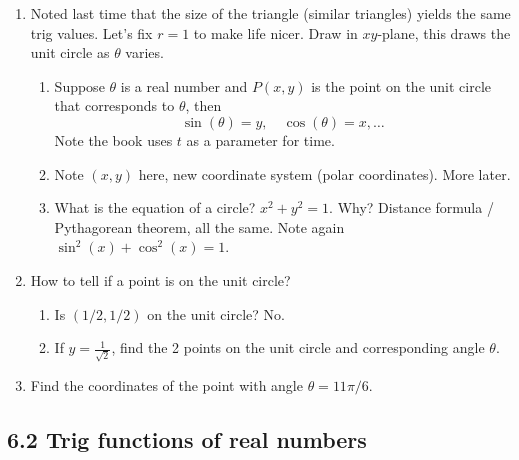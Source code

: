 \documentclass{article}
\begin{document}
\begin{enumerate}

\item Noted last time that the size of the triangle (similar triangles) yields the same trig values. Let's fix $r=1$ to make life nicer. Draw in $xy$-plane, this draws the unit circle as $\theta$ varies.
\begin{enumerate}
\item Suppose $\theta$ is a real number and $P(x,y)$ is the point on the unit circle that corresponds to $\theta$, then
$$
\sin(\theta) = y, \quad \cos(\theta) = x, \dots
$$ 
Note the book uses $t$ as a parameter for time.
\item Note $(x,y)$ here, new coordinate system (polar coordinates). More later.
\item What is the equation of a circle? $x^2+y^2=1$. Why? Distance formula / Pythagorean theorem, all the same. Note again $\sin^2(x)+\cos^2(x)=1$.
\end{enumerate}

\item How to tell if a point is on the unit circle?
\begin{enumerate}
\item Is $(1/2, 1/2)$ on the unit circle? No.
\item If $y= \frac{1}{\sqrt{2}}$, find the 2 points on the unit circle and corresponding angle $\theta$.
\end{enumerate}

\item Find the coordinates of the point with angle $\theta = 11\pi/6$.
\end{enumerate}


\subsection{6.2 Trig functions of real numbers}
\end{document}
